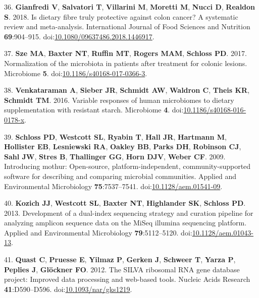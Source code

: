 \documentclass[11pt,]{article}
\begin{document}
\leavevmode\hypertarget{ref-Gianfredi2018}{}%
36. \textbf{Gianfredi V}, \textbf{Salvatori T}, \textbf{Villarini M},
\textbf{Moretti M}, \textbf{Nucci D}, \textbf{Realdon S}. 2018. Is
dietary fibre truly protective against colon cancer? A systematic review
and meta-analysis. International Journal of Food Sciences and Nutrition
\textbf{69}:904--915.
doi:\href{https://doi.org/10.1080/09637486.2018.1446917}{10.1080/09637486.2018.1446917}.

\leavevmode\hypertarget{ref-Sze2017}{}%
37. \textbf{Sze MA}, \textbf{Baxter NT}, \textbf{Ruffin MT},
\textbf{Rogers MAM}, \textbf{Schloss PD}. 2017. Normalization of the
microbiota in patients after treatment for colonic lesions. Microbiome
\textbf{5}.
doi:\href{https://doi.org/10.1186/s40168-017-0366-3}{10.1186/s40168-017-0366-3}.

\leavevmode\hypertarget{ref-Venkataraman2016}{}%
38. \textbf{Venkataraman A}, \textbf{Sieber JR}, \textbf{Schmidt AW},
\textbf{Waldron C}, \textbf{Theis KR}, \textbf{Schmidt TM}. 2016.
Variable responses of human microbiomes to dietary supplementation with
resistant starch. Microbiome \textbf{4}.
doi:\href{https://doi.org/10.1186/s40168-016-0178-x}{10.1186/s40168-016-0178-x}.

\leavevmode\hypertarget{ref-Schloss2009}{}%
39. \textbf{Schloss PD}, \textbf{Westcott SL}, \textbf{Ryabin T},
\textbf{Hall JR}, \textbf{Hartmann M}, \textbf{Hollister EB},
\textbf{Lesniewski RA}, \textbf{Oakley BB}, \textbf{Parks DH},
\textbf{Robinson CJ}, \textbf{Sahl JW}, \textbf{Stres B},
\textbf{Thallinger GG}, \textbf{Horn DJV}, \textbf{Weber CF}. 2009.
Introducing mothur: Open-source, platform-independent,
community-supported software for describing and comparing microbial
communities. Applied and Environmental Microbiology
\textbf{75}:7537--7541.
doi:\href{https://doi.org/10.1128/aem.01541-09}{10.1128/aem.01541-09}.

\leavevmode\hypertarget{ref-Kozich2013}{}%
40. \textbf{Kozich JJ}, \textbf{Westcott SL}, \textbf{Baxter NT},
\textbf{Highlander SK}, \textbf{Schloss PD}. 2013. Development of a
dual-index sequencing strategy and curation pipeline for analyzing
amplicon sequence data on the MiSeq illumina sequencing platform.
Applied and Environmental Microbiology \textbf{79}:5112--5120.
doi:\href{https://doi.org/10.1128/aem.01043-13}{10.1128/aem.01043-13}.

\leavevmode\hypertarget{ref-Quast2012}{}%
41. \textbf{Quast C}, \textbf{Pruesse E}, \textbf{Yilmaz P},
\textbf{Gerken J}, \textbf{Schweer T}, \textbf{Yarza P}, \textbf{Peplies
J}, \textbf{Glöckner FO}. 2012. The SILVA ribosomal RNA gene database
project: Improved data processing and web-based tools. Nucleic Acids
Research \textbf{41}:D590--D596.
doi:\href{https://doi.org/10.1093/nar/gks1219}{10.1093/nar/gks1219}.
\end{document}
